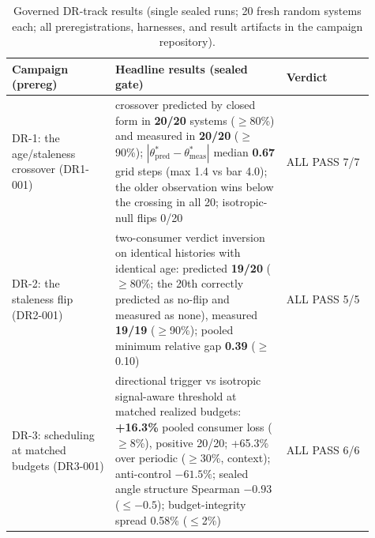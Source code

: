 \documentclass{article}
\theoremstyle{definition}
\theoremstyle{remark}
\begin{document}
\begin{table}[t]
\caption{Governed DR-track results (single sealed runs; 20 fresh random
systems each; all preregistrations, harnesses, and result artifacts in
the campaign repository).}
\label{tab:dr-evidence}
\centering
\begin{tabular}{@{}p{0.26\linewidth}p{0.43\linewidth}p{0.22\linewidth}@{}}
\toprule
\textbf{Campaign (prereg)} & \textbf{Headline results (sealed gate)} & \textbf{Verdict} \\
\midrule
DR-1: the age/staleness crossover (DR1-001) &
crossover predicted by closed form in \textbf{20/20} systems
($\ge$80\%) and measured in \textbf{20/20} ($\ge$90\%);
$|\theta^{*}_{\mathrm{pred}}-\theta^{*}_{\mathrm{meas}}|$ median
\textbf{0.67} grid steps (max 1.4 vs bar 4.0); the older observation
wins below the crossing in all 20; isotropic-null flips 0/20 & ALL
PASS 7/7 \\
\addlinespace
DR-2: the staleness flip (DR2-001) &
two-consumer verdict inversion on identical histories with identical
age: predicted \textbf{19/20} ($\ge$80\%; the 20th correctly predicted
as no-flip and measured as none), measured \textbf{19/19} ($\ge$90\%);
pooled minimum relative gap \textbf{0.39} ($\ge$0.10) & ALL PASS 5/5 \\
\addlinespace
DR-3: scheduling at matched budgets (DR3-001) &
directional trigger vs isotropic signal-aware threshold at matched
realized budgets: \textbf{+16.3\%} pooled consumer loss ($\ge$8\%),
positive 20/20; +65.3\% over periodic ($\ge$30\%, context);
anti-control $-61.5\%$; sealed angle structure Spearman
\textbf{$-0.93$} ($\le-0.5$); budget-integrity spread 0.58\% ($\le$2\%)
& ALL PASS 6/6 \\
\bottomrule
\end{tabular}
\end{table}
\end{document}
